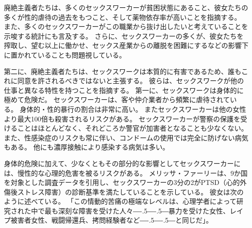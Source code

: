 \documentclass[paper=a4,book,openany]{jlreq}
\def\DDASH{―\kern-.5\zw―\kern-.5\zw―} %
\begin{document}
廃絶主義者たちは、多くのセックスワーカーが貧困状態にあること、彼女たちの多くが性的虐待の過去をもつこと、そして薬物依存率が高いことを指摘する。
また、多くのセックスワーカーがこの職業から抜け出したいと考えていることを示唆する統計にも言及する。
さらに、セックスワーカーの多くが、彼女たちを搾取し、望む以上に働かせ、セックス産業からの離脱を困難にするなどの影響下に置かれていることも問題視している。

第二に、廃絶主義者たちは、セックスワークは本質的に有害であるため、誰もこれに同意を許されるべきではないと主張する。
彼らは、セックスワークが他の仕事と異なる特性を持つことを指摘する。
第一に、セックスワークは身体的に極めて危険だ。
セックスワーカーは、客や仲介業者から頻繁に虐待されている。
身体的・性的暴行の割合は非常に高い。
またセックスワーカーは他の女性より最大100倍も殺害されるリスクがある\citep{salfati08:_prost_homic}。
セックスワーカーが警察の保護を受けることはほとんどなく、それどころか警官が加害者となることも少なくない。
また、性感染症のリスクも常に伴い、コンドームの使用では完全に防げない病気もある。
他にも濃厚接触により感染する病気は多い。

身体的危険に加えて、少なくともその部分的な影響としてセックスワーカーには、慢性的な心理的危害を被るリスクがある。
メリッサ・ファーリーは、9か国を対象とした調査データを引用し、セックスワーカーの3分の2がPTSD（心的外傷後ストレス障害）の診断基準を満たしていることを示している。
彼女は次のように述べている。
「この情動的苦痛の極端なレベルは、心理学者によって研究された中で最も深刻な障害を受けた人々{\DDASH}暴力を受けた女性、レイプ被害者女性、戦闘帰還兵、拷問経験者など{\DDASH}と同じだ」\citep[p.100]{farley18:_risks_prost}。
\end{document}
